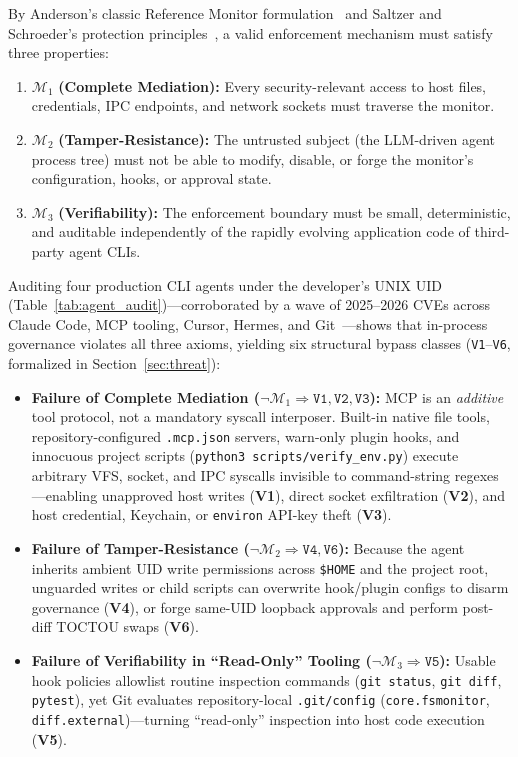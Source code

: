 \documentclass[10pt,journal,compsoc]{IEEEtran}
\begin{document}
By Anderson's classic Reference Monitor formulation~\cite{anderson1972computer} and Saltzer and Schroeder's protection principles~\cite{saltzer1975protection}, a valid enforcement mechanism must satisfy three properties:
\begin{enumerate}
    \item $\mathcal{M}_1$ \textbf{(Complete Mediation):} Every security-relevant access to host files, credentials, IPC endpoints, and network sockets must traverse the monitor.
    \item $\mathcal{M}_2$ \textbf{(Tamper-Resistance):} The untrusted subject (the LLM-driven agent process tree) must not be able to modify, disable, or forge the monitor's configuration, hooks, or approval state.
    \item $\mathcal{M}_3$ \textbf{(Verifiability):} The enforcement boundary must be small, deterministic, and auditable independently of the rapidly evolving application code of third-party agent CLIs.
\end{enumerate}

Auditing four production CLI agents under the developer's UNIX UID (Table~\ref{tab:agent_audit})---corroborated by a wave of 2025--2026 CVEs across Claude Code, MCP tooling, Cursor, Hermes, and Git~\cite{checkpoint2026hook,nvd2026agentfs,nvd2025mcpremote,nvd2026fsmonitor}---shows that in-process governance violates all three axioms, yielding six structural bypass classes (\texttt{V1}--\texttt{V6}, formalized in Section~\ref{sec:threat}):
\begin{itemize}
    \item \textbf{Failure of Complete Mediation ($\neg\mathcal{M}_1 \Rightarrow \texttt{V1}, \texttt{V2}, \texttt{V3}$):} MCP is an \emph{additive} tool protocol, not a mandatory syscall interposer. Built-in native file tools, repository-configured \texttt{.mcp.json} servers, warn-only plugin hooks, and innocuous project scripts (\texttt{python3 scripts/verify\_env.py}) execute arbitrary VFS, socket, and IPC syscalls invisible to command-string regexes---enabling unapproved host writes (\textbf{V1}), direct socket exfiltration (\textbf{V2}), and host credential, Keychain, or \texttt{environ} API-key theft (\textbf{V3}).
    \item \textbf{Failure of Tamper-Resistance ($\neg\mathcal{M}_2 \Rightarrow \texttt{V4}, \texttt{V6}$):} Because the agent inherits ambient UID write permissions across \texttt{\$HOME} and the project root, unguarded writes or child scripts can overwrite hook/plugin configs to disarm governance (\textbf{V4}), or forge same-UID loopback approvals and perform post-diff TOCTOU swaps (\textbf{V6}).
    \item \textbf{Failure of Verifiability in ``Read-Only'' Tooling ($\neg\mathcal{M}_3 \Rightarrow \texttt{V5}$):} Usable hook policies allowlist routine inspection commands (\texttt{git status}, \texttt{git diff}, \texttt{pytest}), yet Git evaluates repository-local \texttt{.git/config} (\texttt{core.fsmonitor}, \texttt{diff.external})---turning ``read-only'' inspection into host code execution (\textbf{V5}).
\end{itemize}
\end{document}
